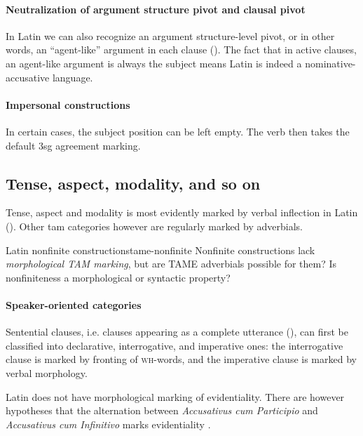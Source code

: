 \documentclass[a4paper, oneside, 12pt]{report}
\newcommand{\form}[1]{\emph{#1}}
\newcommand*{\category}[1]{\textsc{#1}}
\begin{document}
\paragraph*{Neutralization of argument structure pivot and clausal pivot}
In Latin we can also recognize an argument structure-level pivot,
or in other words, an ``agent-like'' argument in each clause
().
The fact that in active clauses, an agent-like argument is always the subject 
means Latin is indeed a nominative-accusative language.

\paragraph*{Impersonal constructions}
In certain cases, the subject position can be left empty.
The verb then takes the default 3sg agreement marking.

\subsection{Tense, aspect, modality, and so on}\label{sec:grammatical.clause.tam}

Tense, aspect and modality is most evidently marked by verbal inflection in Latin 
().
Other \ac{tam} categories however are regularly marked by adverbials.

\begin{todobox}{Latin nonfinite constructions}{tame-nonfinite}
    Nonfinite constructions lack \emph{morphological TAM marking},
    but are TAME adverbials possible for them?
    Is nonfiniteness a morphological or syntactic property?
\end{todobox}

\paragraph*{Speaker-oriented categories}
Sentential clauses, i.e. clauses appearing as a complete utterance (),
can first be classified into declarative, interrogative, and imperative ones:
the interrogative clause is marked by fronting of \category{wh}-words,
and the imperative clause is marked by verbal morphology.

Latin does not have morphological marking of evidentiality.
There are however hypotheses that the alternation between
\form{Accusativus cum Participio} and \form{Accusativus cum Infinitivo}
marks evidentiality \citep{greco2013latin}.
\end{document}
